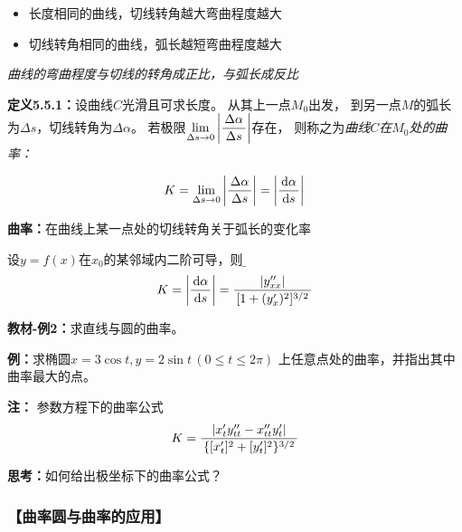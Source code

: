 \begin{itemize}
  \setlength{\itemindent}{1cm}
  \item 长度相同的曲线，切线转角越大弯曲程度越大
  \item 切线转角相同的曲线，弧长越短弯曲程度越大
\end{itemize}

{\it 曲线的弯曲程度与切线的转角成正比，与弧长成反比}

{\bf 定义5.5.1：}设曲线$C$光滑且可求长度。 从其上一点$M_0$出发，
到另一点$M$的弧长为$\Delta s$，切线转角为$\Delta\alpha$。
 若极限$\lim\limits_{\Delta s\to
0}\left|\displaystyle\frac{\,{\Delta\alpha}\,}{\,{\Delta s}\,}\right|$存在，
则称之为{\it 曲线$C$在$M_0$处的曲率：}

$${K=\lim\limits_{\Delta s\to
0}\left|\displaystyle\frac{\,{\Delta\alpha}\,}{\,{\Delta s}\,}\right|
=\left|\displaystyle\frac{\,{\mathrm{d}\alpha}\,}{\,{\mathrm{d} s}\,}\right|}$$ 

{\bf 曲率：}在曲线上某一点处的切线转角关于弧长的变化率


设$y=f(x)$在$x_0$的某邻域内二阶可导，则
{\b $$K=\left|\displaystyle\frac{\,{\mathrm{d}\alpha}\,}{\,{\mathrm{d} s}\,}\right|
 =\displaystyle\frac{\,{|y''_{xx}|}\,}{\,{[1+(y'_x)^2]^{3/2}}\,}$$}
 
{\bf 教材-例2：}求直线与圆的曲率。

{\bf 例：}求椭圆$x=3\cos t,y=2\sin t\,(0\leq t\leq 2\pi)$
上任意点处的曲率，并指出其中曲率最大的点。

\begin{center}
\end{center}

{\bf 注：} {参数方程下的曲率公式}
$${K=\displaystyle\frac{\,{|x'_ty''_{tt}-x''_{tt}y'_t|}\,}{\,{\{[x'_t]^2+[y'_t]^2\}^{3/2}}\,}}$$

{\bf 思考：}如何给出极坐标下的曲率公式？

\subsubsection{【曲率圆与曲率的应用】}

